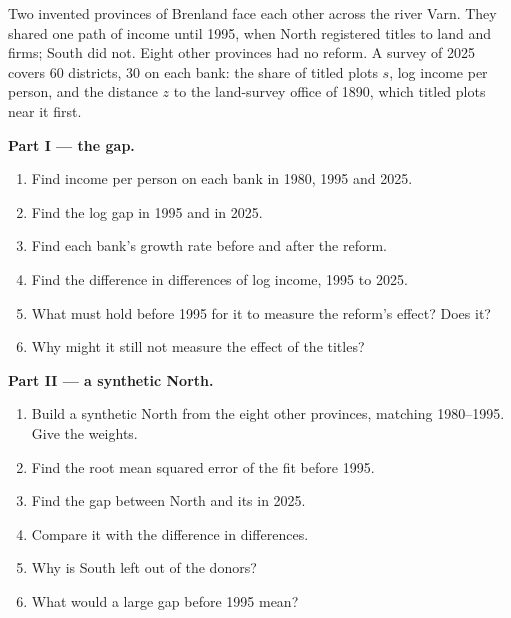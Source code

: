 \begin{problem}\label{pb:b3:institutions:river}
Two invented provinces of Brenland face each other across the river Varn. They
shared one path of income until 1995, when North registered titles to land and firms;
South did not. Eight other provinces had no reform. A survey of 2025 covers 60
districts, 30 on each bank: the share of titled plots $s$, log income per person, and the
distance $z$ to the land-survey office of 1890, which titled plots near it first. %

\medskip\noindent\textbf{Part I --- the gap.}
\begin{enumerate}
\item Find income per person on each bank in 1980, 1995 and 2025.
\item Find the log gap in 1995 and in 2025.
\item Find each bank's growth rate before and after the reform.
\item Find the difference in differences of log income, 1995 to 2025.
\item What must hold before 1995 for it to measure the reform's effect? Does it?
\item Why might it still not measure the effect of the titles?
\end{enumerate}

\medskip\noindent\textbf{Part II --- a synthetic North.}
\begin{enumerate}[resume]
\item Build a synthetic North from the eight other provinces, matching 1980--1995. Give
the weights.
\item Find the root mean squared error of the fit before 1995.
\item Find the gap between North and its  in 2025.
\item Compare it with the difference in differences.
\item Why is South left out of the donors?
\item What would a large gap before 1995 mean?
\end{enumerate}


\end{problem}
